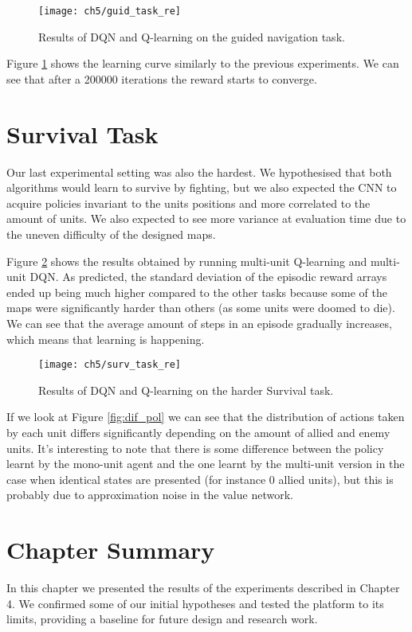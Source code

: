 \begin{figure}[h]
    \centering
    \texttt{[image: ch5/guid\_task\_re]}
    \caption{Results of DQN and Q-learning on the guided navigation task.}
    \label{fig:guid_task_results}
\end{figure}

Figure \ref{fig:guid_task_results} shows the learning curve similarly to the
previous experiments. We can see that after a 200000 iterations the reward
starts to converge. 

\section{Survival Task}

Our last experimental setting was also the hardest. We hypothesised that both
algorithms would learn to survive by fighting, but we also expected the CNN to
acquire policies invariant to the units positions and more correlated to the
amount of units. We also expected to see more variance at evaluation time due to
the uneven difficulty of the designed maps.


Figure \ref{fig:surv_task_results} shows the results obtained by running
multi-unit Q-learning and multi-unit DQN. As predicted, the standard deviation
of the episodic reward arrays ended up being much higher compared to the other
tasks because some of the maps were significantly harder than others (as some
units were doomed to die). We can see that the average amount of steps in an
episode gradually increases, which means that learning is happening.

\begin{figure}[h]
    \centering
    \texttt{[image: ch5/surv\_task\_re]}
    \caption{Results of DQN and Q-learning on the harder Survival task.}
    \label{fig:surv_task_results}
\end{figure}

If we look at Figure \ref{fig:dif_pol} we can see that the distribution of
actions taken by each unit differs significantly depending on the amount of
allied and enemy units. It's interesting to note that there is some difference
between the policy learnt by the mono-unit agent and the one learnt by the
multi-unit version in the case when identical states are presented (for instance
0 allied units), but this is probably due to approximation noise in the
value network.



\section{Chapter Summary}

In this chapter we presented the results of the experiments described in Chapter
4. We confirmed some of our initial hypotheses and tested the platform to its
limits, providing a baseline for future design and research work.
